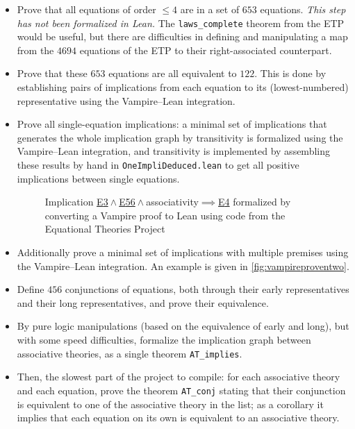 \documentclass[12pt]{amsart}
\newcommand{\leancomment}{\color{gray}}
\theoremstyle{plain}
\theoremstyle{definition}
\newcommand{\Equaref}[1]{\href{https://teorth.github.io/equational_theories/implications/?#1}{\textrm{\textup{E}}#1}}
\begin{document}
\begin{itemize}\setlength{\itemsep}{3pt plus 3pt}
\item Prove that all equations of order $\leq 4$ are in a set of $653$ equations.  \emph{This step has not been formalized in Lean.}  The \texttt{laws\_complete} theorem from the ETP would be useful, but there are difficulties in defining and manipulating a map from the $4694$ equations of the ETP to their right-associated counterpart.

\item Prove that these $653$ equations are all equivalent to $122$.  This is done by establishing pairs of implications from each equation to its (lowest-numbered) representative using the Vampire--Lean integration.

\item Prove all single-equation implications: a minimal set of implications that generates the whole implication graph by transitivity is formalized using the Vampire--Lean integration, and transitivity is implemented by assembling these results by hand in \texttt{OneImpliDeduced.lean} to get all positive implications between single equations.

\begin{figure}\centering
\renewcommand{\leancomment}[1]{}
\fbox{}
\caption{\label{fig:vampireproventwo}Implication \Equaref{3}${}\wedge{}$\Equaref{56}${}\wedge{}$associativity$\implies$\Equaref{4} formalized by converting a Vampire proof to Lean using code from the Equational Theories Project}
\end{figure}

\item Additionally prove a minimal set of implications with multiple premises using the Vampire--Lean integration.  An example is given in \autoref{fig:vampireproventwo}.

\item Define $456$ conjunctions of equations, both through their early representatives and their long representatives, and prove their equivalence.

\item By pure logic manipulations (based on the equivalence of early and long), but with some speed difficulties, formalize the implication graph between associative theories, as a single theorem \texttt{AT\_implies}.

\item Then, the slowest part of the project to compile: for each associative theory and each equation, prove the theorem \texttt{AT\_conj} stating that their conjunction is equivalent to one of the associative theory in the list; as a corollary it implies that each equation on its own is equivalent to an associative theory.


\end{itemize}
\end{document}
